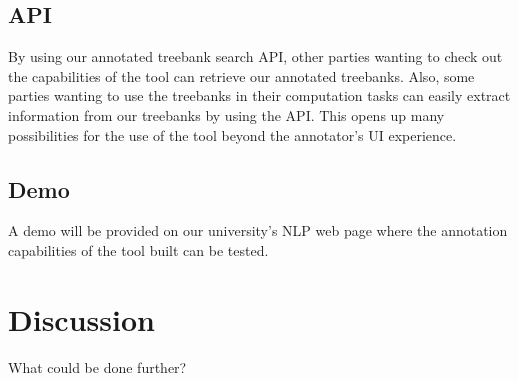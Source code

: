 \documentclass[
]{ceurart}
\begin{document}
\subsection{API}

By using our annotated treebank search API, other parties wanting to check out the capabilities of the tool can retrieve our annotated treebanks.
Also, some parties wanting to use the treebanks in their computation tasks can easily extract information from our treebanks by using the API.
This opens up many possibilities for the use of the tool beyond the annotator's UI experience.

\subsection{Demo}

A demo will be provided on our university's NLP web page where the annotation capabilities of the tool built can be tested.

\section{Discussion}

What could be done further?


\end{document}
